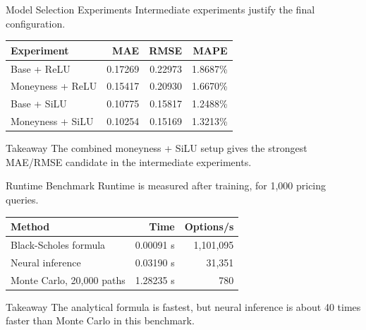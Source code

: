 \documentclass[10pt,aspectratio=43]{beamer}
\newcommand{\takeaway}[1]{%
    \begin{block}{Takeaway}
        #1
    \end{block}
}
\begin{document}
\begin{frame}{Model Selection Experiments}
    Intermediate experiments justify the final configuration.

    \begin{center}
        \scriptsize
        \begin{tabular}{lrrr}
            \toprule
            Experiment       & MAE     & RMSE    & MAPE     \\
            \midrule
            Base + ReLU      & 0.17269 & 0.22973 & 1.8687\% \\
            Moneyness + ReLU & 0.15417 & 0.20930 & 1.6670\% \\
            Base + SiLU      & 0.10775 & 0.15817 & 1.2488\% \\
            Moneyness + SiLU & 0.10254 & 0.15169 & 1.3213\% \\
            \bottomrule
        \end{tabular}
    \end{center}

    \takeaway{The combined moneyness + SiLU setup gives the strongest MAE/RMSE candidate in the intermediate experiments.}
\end{frame}

\begin{frame}{Runtime Benchmark}
    Runtime is measured after training, for 1,000 pricing queries.

    \begin{center}
        \scriptsize
        \begin{tabular}{lrr}
            \toprule
            Method                    & Time      & Options/s \\
            \midrule
            Black-Scholes formula     & 0.00091 s & 1,101,095 \\
            Neural inference          & 0.03190 s & 31,351    \\
            Monte Carlo, 20,000 paths & 1.28235 s & 780       \\
            \bottomrule
        \end{tabular}
    \end{center}

    \takeaway{The analytical formula is fastest, but neural inference is about 40 times faster than Monte Carlo in this benchmark.}
\end{frame}
\end{document}
